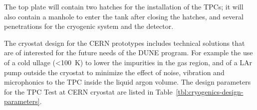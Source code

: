 The top plate will contain two hatches for the installation of the TPCs; it will also contain a manhole to enter the tank after closing the hatches, and several penetrations for the cryogenic system and the detector. 


%
The cryostat design for the CERN prototypes includes technical solutions that are of interested for the future needs of the DUNE program. For example the use of a cold ullage (\textless  100~K) to lower the impurities in the gas region, and of a LAr pump outside the cryostat to minimize the effect of noise, vibration and microphonics to the TPC inside the liquid argon volume.
%
The design parameters for the TPC Test at CERN cryostat are listed in Table~\ref{tbl:cryogenics-design-parameters}.

